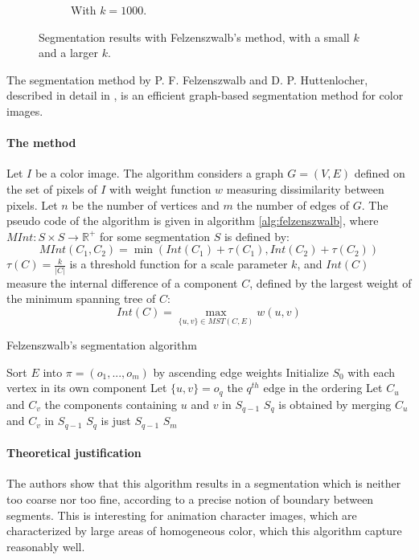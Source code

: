 \begin{figure}[htb!]
\begin{subfigure}{.3\textwidth}
\caption{With $k = 1000$.}
\label{fig:largeKSegmentation}
\end{subfigure}
\caption{Segmentation results with Felzenszwalb's method, with a small $k$ and a larger $k$.}
\end{figure}

The segmentation method by P. F. Felzenszwalb and D. P. Huttenlocher, described in detail in \cite{felzenszwalb2004efficient}, is an efficient graph-based segmentation method for color images.

\paragraph{The method} Let $I$ be a color image. The algorithm considers a graph $G = (V,E)$ defined on the set of pixels of $I$ with weight function $w$ measuring dissimilarity between pixels. Let $n$ be the number of vertices and $m$ the number of edges of $G$. The pseudo code of the algorithm is given in algorithm \autoref{alg:felzenszwalb}, where $MInt : S \times S \rightarrow \mathbb{R}^+$ for some segmentation $S$ is defined by:
\[
MInt(C_1, C_2) = \min(Int(C_1) + \tau(C_1), Int(C_2) + \tau(C_2))
\]
$\tau(C) = \frac{k}{|C|}$ is a threshold function for a scale parameter $k$, and $Int(C)$ measure the internal difference of a component $C$, defined by
the largest weight of the minimum spanning tree of $C$:
\[
Int(C) = \max_{\{u,v\} \in MST(C, E)} w(u,v)
\]

\begin{algorithm}
\caption{Felzenszwalb's segmentation algorithm}
\label{alg:felzenszwalb}

\begin{algorithmic}[1]
\State Sort $E$ into $\pi = (o_1, ..., o_m)$ by ascending edge weights
\State Initialize $S_0$ with each vertex in its own component
\State Let $\{u,v\} = o_q$ the $q^{th}$ edge in the ordering
\State Let $C_u$ and $C_v$ the components containing $u$ and $v$ in $S_{q-1}$
\State $S_q$ is obtained by merging $C_u$ and $C_v$ in $S_{q-1}$
\Else
\State $S_q$ is just $S_{q-1}$
\EndIf
\EndFor
\Return $S_m$
\EndFunction
\end{algorithmic}
\end{algorithm}

\paragraph{Theoretical justification} The authors show that this algorithm results in a segmentation which is neither too coarse nor too fine, according to a precise notion of boundary between segments. This is interesting for animation character images, which are characterized by large areas of homogeneous color, which this algorithm capture reasonably well.

